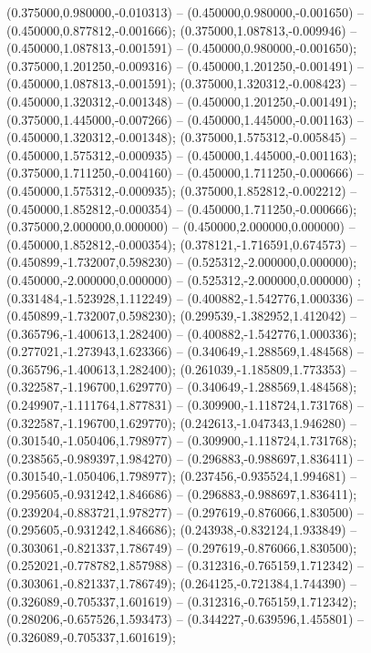 (0.375000,0.980000,-0.010313) -- (0.450000,0.980000,-0.001650) -- (0.450000,0.877812,-0.001666);
 (0.375000,1.087813,-0.009946) -- (0.450000,1.087813,-0.001591) -- (0.450000,0.980000,-0.001650);
 (0.375000,1.201250,-0.009316) -- (0.450000,1.201250,-0.001491) -- (0.450000,1.087813,-0.001591);
 (0.375000,1.320312,-0.008423) -- (0.450000,1.320312,-0.001348) -- (0.450000,1.201250,-0.001491);
 (0.375000,1.445000,-0.007266) -- (0.450000,1.445000,-0.001163) -- (0.450000,1.320312,-0.001348);
 (0.375000,1.575312,-0.005845) -- (0.450000,1.575312,-0.000935) -- (0.450000,1.445000,-0.001163);
 (0.375000,1.711250,-0.004160) -- (0.450000,1.711250,-0.000666) -- (0.450000,1.575312,-0.000935);
 (0.375000,1.852812,-0.002212) -- (0.450000,1.852812,-0.000354) -- (0.450000,1.711250,-0.000666);
 (0.375000,2.000000,0.000000) -- (0.450000,2.000000,0.000000) -- (0.450000,1.852812,-0.000354);
 (0.378121,-1.716591,0.674573) -- (0.450899,-1.732007,0.598230) -- (0.525312,-2.000000,0.000000);
 (0.450000,-2.000000,0.000000) -- (0.525312,-2.000000,0.000000) ;
 (0.331484,-1.523928,1.112249) -- (0.400882,-1.542776,1.000336) -- (0.450899,-1.732007,0.598230);
 (0.299539,-1.382952,1.412042) -- (0.365796,-1.400613,1.282400) -- (0.400882,-1.542776,1.000336);
 (0.277021,-1.273943,1.623366) -- (0.340649,-1.288569,1.484568) -- (0.365796,-1.400613,1.282400);
 (0.261039,-1.185809,1.773353) -- (0.322587,-1.196700,1.629770) -- (0.340649,-1.288569,1.484568);
 (0.249907,-1.111764,1.877831) -- (0.309900,-1.118724,1.731768) -- (0.322587,-1.196700,1.629770);
 (0.242613,-1.047343,1.946280) -- (0.301540,-1.050406,1.798977) -- (0.309900,-1.118724,1.731768);
 (0.238565,-0.989397,1.984270) -- (0.296883,-0.988697,1.836411) -- (0.301540,-1.050406,1.798977);
 (0.237456,-0.935524,1.994681) -- (0.295605,-0.931242,1.846686) -- (0.296883,-0.988697,1.836411);
 (0.239204,-0.883721,1.978277) -- (0.297619,-0.876066,1.830500) -- (0.295605,-0.931242,1.846686);
 (0.243938,-0.832124,1.933849) -- (0.303061,-0.821337,1.786749) -- (0.297619,-0.876066,1.830500);
 (0.252021,-0.778782,1.857988) -- (0.312316,-0.765159,1.712342) -- (0.303061,-0.821337,1.786749);
 (0.264125,-0.721384,1.744390) -- (0.326089,-0.705337,1.601619) -- (0.312316,-0.765159,1.712342);
 (0.280206,-0.657526,1.593473) -- (0.344227,-0.639596,1.455801) -- (0.326089,-0.705337,1.601619);
